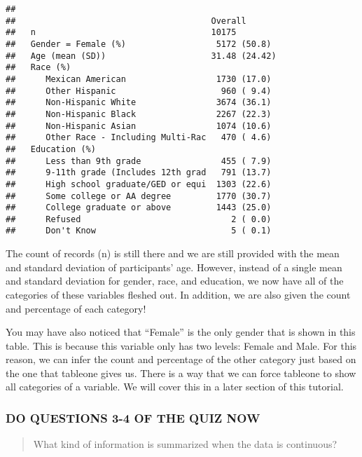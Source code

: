 \documentclass[
]{book}
\begin{document}
\begin{verbatim}
##                                      
##                                       Overall      
##   n                                   10175        
##   Gender = Female (%)                  5172 (50.8) 
##   Age (mean (SD))                     31.48 (24.42)
##   Race (%)                                         
##      Mexican American                  1730 (17.0) 
##      Other Hispanic                     960 ( 9.4) 
##      Non-Hispanic White                3674 (36.1) 
##      Non-Hispanic Black                2267 (22.3) 
##      Non-Hispanic Asian                1074 (10.6) 
##      Other Race - Including Multi-Rac   470 ( 4.6) 
##   Education (%)                                    
##      Less than 9th grade                455 ( 7.9) 
##      9-11th grade (Includes 12th grad   791 (13.7) 
##      High school graduate/GED or equi  1303 (22.6) 
##      Some college or AA degree         1770 (30.7) 
##      College graduate or above         1443 (25.0) 
##      Refused                              2 ( 0.0) 
##      Don't Know                           5 ( 0.1)
\end{verbatim}

The count of records (n) is still there and we are still provided with the mean and standard deviation of participants' age. However, instead of a single mean and standard deviation for gender, race, and education, we now have all of the categories of these variables fleshed out. In addition, we are also given the count and percentage of each category!

You may have also noticed that ``Female'' is the only gender that is shown in this table. This is because this variable only has two levels: Female and Male. For this reason, we can infer the count and percentage of the other category just based on the one that tableone gives us. There is a way that we can force tableone to show all categories of a variable. We will cover this in a later section of this tutorial.

\hypertarget{do-questions-3-4-of-the-quiz-now}{%
\subsubsection{DO QUESTIONS 3-4 OF THE QUIZ NOW}\label{do-questions-3-4-of-the-quiz-now}}

\begin{quote}
What kind of information is summarized when the data is continuous?
\end{quote}
\end{document}

